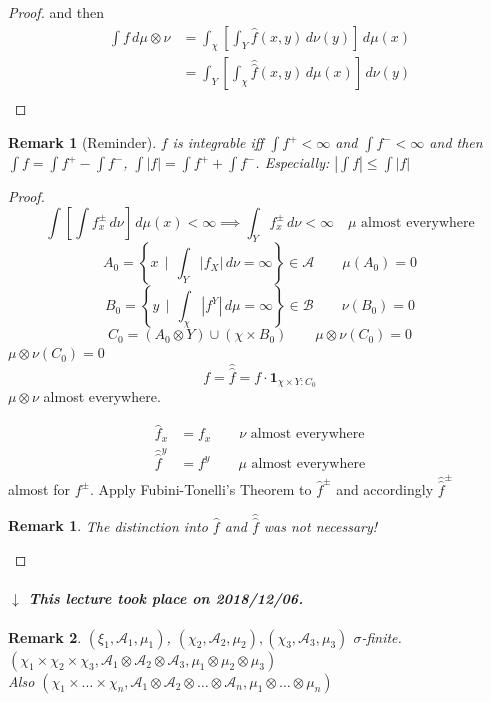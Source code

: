 \documentclass[a4paper]{article}
\newcounter{lecref}[section]
\numberwithin{lecref}{section}
\theoremstyle{break}
\newtheorem{remark}[lecref]{Remark}
\newtheorem*{Remark}{Remark}
\newcommand{\dateref}[1]{%
  \begin{mdframed}[backgroundcolor=gray!10,innerbottommargin=0pt,innertopmargin=0pt]
    \paragraph{\textit{$\downarrow$ This lecture took place on #1.}}%
  \end{mdframed}%
}
\newcommand{\Abs}[1]{\left|#1\right|}
\newcommand{\SetDef}[2]{\left\{#1\,\mid\,#2\right\}}
\begin{document}
\begin{proof}
  and then
  \begin{align*}
    \int f \, d\mu \otimes \nu
      &= \int_\chi \left[ \int_Y \hat{f}(x, y) \, d\nu(y) \right] \, d\mu(x) \\
      &= \int_Y \left[ \int_\chi \hat{\hat{f}}(x, y) \, d\mu(x) \right] \, d\nu(y) \\
  \end{align*}
\end{proof}

\begin{remark}[Reminder]
  $f$ is integrable iff $\int f^+ < \infty$ and $\int f^- < \infty$
  and then $\int f = \int f^+ - \int f^-$, $\int \Abs{f} = \int f^+ + \int f^-$.
  Especially: $\Abs{\int f} \leq \int \Abs{f}$
\end{remark}

\begin{proof}
  \[ \int \left[\int f_x^\pm \, d\nu\right] \, d\mu(x) < \infty \implies \int_Y f_x^\pm \, d\nu < \infty \quad \mu \text{ almost everywhere} \]
  \[ A_0 = \SetDef{x}{\int_Y \Abs{f_X} \, d\nu = \infty} \in \mathcal A \qquad \mu(A_0) = 0 \]
  \[ B_0 = \SetDef{y}{\int_\chi \Abs{f^Y} \, d\mu = \infty} \in \mathcal B \qquad \nu(B_0) = 0 \]
  \[ C_0 = \left(A_0 \otimes Y\right) \cup \left(\chi \times B_0\right) \qquad \mu \otimes \nu(C_0) = 0 \]
  $\mu \otimes \nu(C_0) = 0$
  \[ f = \hat{\hat{f}} = f \cdot \mathbf{1}_{\chi \times Y: C_0} \]
  $\mu \otimes \nu$ almost everywhere.

  \begin{align*}
    \hat{f}_x &= f_x  \qquad \nu\text{ almost everywhere} \\
    \hat{\hat{f}}^y &= f^y  \qquad \mu\text{ almost everywhere}
  \end{align*}
  almost for $f^\pm$.
  Apply Fubini-Tonelli's Theorem to $\hat{f}^\pm$ and accordingly $\hat{\hat{f}}^\pm$

  \begin{Remark}
    The distinction into $\hat{f}$ and $\hat{\hat{f}}$ was not necessary!
  \end{Remark}
\end{proof}

\dateref{2018/12/06}

\begin{Remark}
  $(\xi_1, \mathcal A_1, \mu_1)$, $(\chi_2, \mathcal A_2, \mu_2), (\chi_3, \mathcal A_3, \mu_3)$ $\sigma$-finite. \\
  $(\chi_1 \times \chi_2 \times \chi_3, \mathcal A_1 \otimes \mathcal A_2 \otimes \mathcal A_3, \mu_1 \otimes \mu_2 \otimes \mu_3)$ \\
  Also $(\chi_1 \times \dots \times \chi_n, \mathcal A_1 \otimes \mathcal A_2 \otimes \dots \otimes \mathcal A_n, \mu_1 \otimes \dots \otimes \mu_n)$
\end{Remark}
\end{document}
